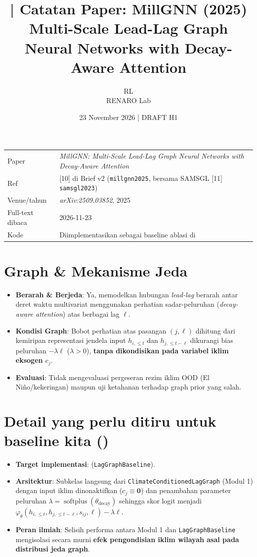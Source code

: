 \documentclass[11pt,a4paper]{article}
\title{\jobid{RL-H1-02} | Catatan Paper: MillGNN (2025)\\
\large Multi-Scale Lead-Lag Graph Neural Networks with Decay-Aware Attention}
\author{RL \\ \small RENARO Lab}
\date{23 November 2026 \quad | \quad \textcolor{blue!65!black}{DRAFT H1}}
\begin{document}
\maketitle

\begin{table}[H]
\centering
\small
\begin{tabular}{@{}L{3.4cm}L{11.2cm}@{}}
\toprule
Paper & \emph{MillGNN: Multi-Scale Lead-Lag Graph Neural Networks with Decay-Aware Attention} \\
Ref & [10] di Brief v2 (\texttt{millgnn2025}, bersama SAMSGL [11] \texttt{samsgl2023}) \\
Venue/tahun & \emph{arXiv:2509.03852}, 2025 \\
Full-text dibaca & 2026-11-23 \\
Kode & Diimplementasikan sebagai baseline ablasi  di  \\
\bottomrule
\end{tabular}
\end{table}

\section{Graph \& Mekanisme Jeda}
\begin{itemize}
  \item \textbf{Berarah \& Berjeda}: Ya, memodelkan hubungan \emph{lead-lag} berarah antar deret waktu multivariat menggunakan perhatian sadar-peluruhan (\emph{decay-aware attention}) atas berbagai lag $\ell$.
  \item \textbf{Kondisi Graph}: Bobot perhatian atas pasangan $(j, \ell)$ dihitung dari kemiripan representasi jendela input $h_{i,\le t}$ dan $h_{j,\le t-\ell}$ dikurangi bias peluruhan $-\lambda \ell$ ($\lambda > 0$), \textbf{tanpa dikondisikan pada variabel iklim eksogen $c_j$}.
  \item \textbf{Evaluasi}: Tidak mengevaluasi pergeseran rezim iklim OOD (El Ni\~no/kekeringan) maupun uji ketahanan terhadap graph prior yang salah.
\end{itemize}

\section{Detail yang perlu ditiru untuk baseline kita ()}
\begin{itemize}
  \item \textbf{Target implementasi}:  (\texttt{LagGraphBaseline}).
  \item \textbf{Arsitektur}: Subkelas langsung dari \texttt{ClimateConditionedLagGraph} (Modul 1) dengan input iklim dinonaktifkan ($c_j \equiv \mathbf{0}$) dan penambahan parameter peluruhan $\lambda = \operatorname{softplus}(\theta_{\text{decay}})$ sehingga skor logit menjadi $\varphi_\theta(h_{i,\le t}, h_{j,\le t-\ell}, s_{ij}, \ell) - \lambda \ell$.
  \item \textbf{Peran ilmiah}: Selisih performa antara Modul 1 dan \texttt{LagGraphBaseline} mengisolasi secara murni \textbf{efek pengondisian iklim wilayah asal pada distribusi jeda graph}.
\end{itemize}
\end{document}
